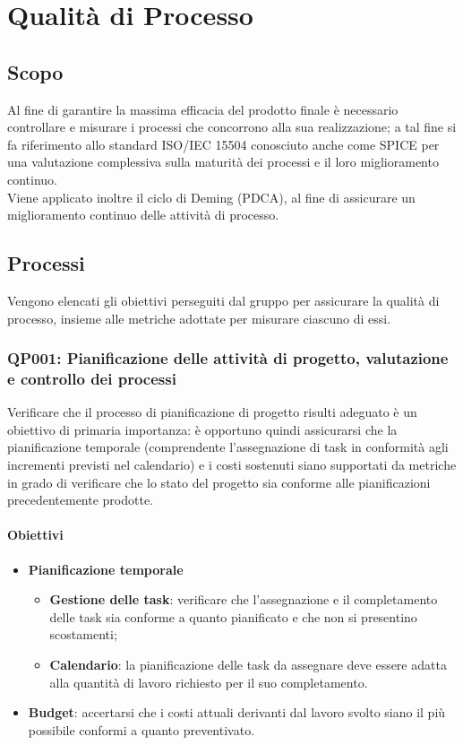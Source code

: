 \chapter{Qualità di Processo}
\label{processo} 
\section{Scopo}
Al fine di garantire la massima efficacia del prodotto finale è necessario controllare e misurare i processi che concorrono alla sua realizzazione; a tal fine si fa riferimento allo standard ISO/IEC 15504 conosciuto anche come SPICE per una valutazione complessiva sulla maturità dei processi e il loro miglioramento continuo.\\
Viene applicato inoltre il ciclo di Deming (PDCA), al fine di assicurare un miglioramento continuo delle attività di processo. 

\section{Processi}\label{processi}
Vengono elencati gli obiettivi perseguiti dal gruppo per assicurare la qualità di processo, insieme alle metriche adottate per misurare ciascuno di essi.
\subsection{QP001: Pianificazione delle attività di progetto, valutazione e controllo dei processi}
Verificare che il processo di pianificazione di progetto risulti adeguato è un obiettivo di primaria importanza: è opportuno quindi assicurarsi che la pianificazione temporale (comprendente l'assegnazione di task in conformità agli incrementi previsti nel calendario) e i costi sostenuti siano supportati da metriche in grado di verificare che lo stato del progetto sia conforme alle pianificazioni precedentemente prodotte.


\subsubsection{Obiettivi}
\begin{itemize}
	\item \textbf{Pianificazione temporale}
	\begin{itemize}
		\item \textbf{Gestione delle task}: verificare che l'assegnazione e il completamento delle task sia conforme a quanto pianificato e che non si presentino scostamenti;
		\item \textbf{Calendario}: la pianificazione delle task da assegnare deve essere adatta alla quantità di lavoro richiesto per il suo completamento.
	\end{itemize}
	\item \textbf{Budget}: accertarsi che i costi attuali derivanti dal lavoro svolto siano il più possibile conformi a quanto preventivato.
\end{itemize}
